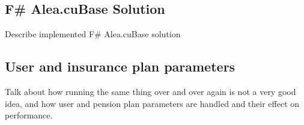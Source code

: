 \subsection{F\# Alea.cuBase Solution}
Describe implemented F\# Alea.cuBase solution

\subsection{User and insurance plan parameters}
Talk about how running the same thing over and over again is not a very good idea, and how user and pension plan parameters are handled and their effect on performance.